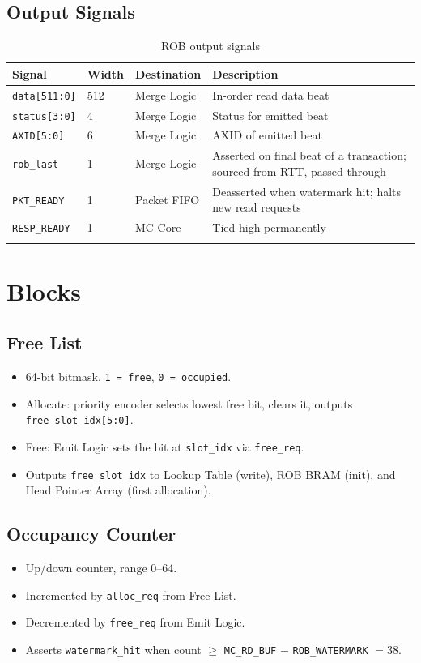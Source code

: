 \documentclass[11pt]{article}
\begin{document}
\subsection*{Output Signals}
\begin{longtable}{llll}
\toprule
\textbf{Signal} & \textbf{Width} & \textbf{Destination} & \textbf{Description} \\
\midrule
\texttt{data[511:0]}    & 512 & Merge Logic  & In-order read data beat \\
\texttt{status[3:0]}    & 4   & Merge Logic  & Status for emitted beat \\
\texttt{AXID[5:0]}      & 6   & Merge Logic  & AXID of emitted beat \\
\texttt{rob\_last}      & 1   & Merge Logic  & Asserted on final beat of a transaction; sourced from RTT, passed through \\
\texttt{PKT\_READY}     & 1   & Packet FIFO  & Deasserted when watermark hit; halts new read requests \\
\texttt{RESP\_READY}    & 1   & MC Core      & Tied high permanently \\
\bottomrule
\caption{ROB output signals}
\end{longtable}

\section{Blocks}

\subsection{Free List}
\begin{itemize}[noitemsep]
  \item 64-bit bitmask. \texttt{1 = free}, \texttt{0 = occupied}.
  \item Allocate: priority encoder selects lowest free bit, clears it, outputs \texttt{free\_slot\_idx[5:0]}.
  \item Free: Emit Logic sets the bit at \texttt{slot\_idx} via \texttt{free\_req}.
  \item Outputs \texttt{free\_slot\_idx} to Lookup Table (write), ROB BRAM (init), and Head Pointer Array (first allocation).
\end{itemize}

\subsection{Occupancy Counter}
\begin{itemize}[noitemsep]
  \item Up/down counter, range 0--64.
  \item Incremented by \texttt{alloc\_req} from Free List.
  \item Decremented by \texttt{free\_req} from Emit Logic.
  \item Asserts \texttt{watermark\_hit} when count $\geq$ \texttt{MC\_RD\_BUF} $-$ \texttt{ROB\_WATERMARK} $= 38$.
\end{itemize}
\end{document}
